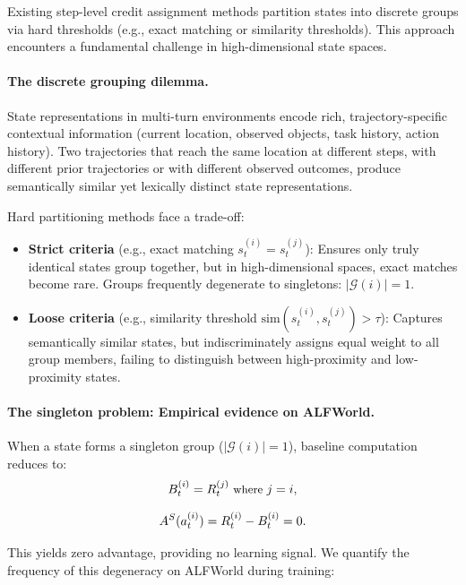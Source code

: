 \documentclass[11pt]{article}
\begin{document}
Existing step-level credit assignment methods partition states into discrete groups via hard thresholds (e.g., exact matching or similarity thresholds). This approach encounters a fundamental challenge in high-dimensional state spaces.

\paragraph{The discrete grouping dilemma.}
State representations in multi-turn environments encode rich, trajectory-specific contextual information (current location, observed objects, task history, action history). Two trajectories that reach the same location at different steps, with different prior trajectories or with different observed outcomes, produce semantically similar yet lexically distinct state representations.

Hard partitioning methods face a trade-off:
\begin{itemize}
\item \textbf{Strict criteria} (e.g., exact matching $s_t^{(i)} = s_t^{(j)}$): Ensures only truly identical states group together, but in high-dimensional spaces, exact matches become rare. Groups frequently degenerate to singletons: $|\mathcal{G}(i)| = 1$.

\item \textbf{Loose criteria} (e.g., similarity threshold $\text{sim}(s_t^{(i)}, s_t^{(j)}) > \tau$): Captures semantically similar states, but indiscriminately assigns equal weight to all group members, failing to distinguish between high-proximity and low-proximity states.
\end{itemize}

\paragraph{The singleton problem: Empirical evidence on ALFWorld.}

When a state forms a singleton group ($|\mathcal{G}(i)| = 1$), baseline computation reduces to:
\begin{equation}
\small
B_t^{(i)} = R_t^{(j)} \text{ where } j = i,
\end{equation}

\begin{equation}
\small
A^S(a_t^{(i)}) = R_t^{(i)} - B_t^{(i)} = 0.
\end{equation}

This yields zero advantage, providing no learning signal. We quantify the frequency of this degeneracy on ALFWorld during training:
\end{document}
